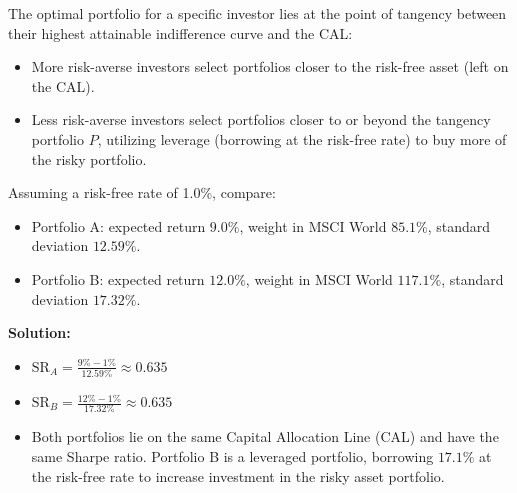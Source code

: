 The optimal portfolio for a specific investor lies at the point of tangency between their highest attainable indifference curve and the CAL:
\begin{itemize}
	\item More risk-averse investors select portfolios closer to the risk-free asset (left on the CAL).
	\item Less risk-averse investors select portfolios closer to or beyond the tangency portfolio $P$, utilizing leverage (borrowing at the risk-free rate) to buy more of the risky portfolio.
\end{itemize}
\begin{tcolorbox}[
	colback=gray!5!white,
	colframe=black!15!white,
	boxrule=0.5pt,
	arc=3pt,
	title=\textbf{Example 14: Calculating the Sharpe Ratio},
	coltitle=black,
	colbacktitle=black!5!white,
	before skip=6pt,
	after skip=6pt,
	breakable
]
Assuming a risk-free rate of 1.0\%, compare:
\begin{itemize}
	\item Portfolio A: expected return $9.0\%$, weight in MSCI World $85.1\%$, standard deviation $12.59\%$.
	\item Portfolio B: expected return $12.0\%$, weight in MSCI World $117.1\%$, standard deviation $17.32\%$.
\end{itemize}
\textbf{Solution:}
\begin{itemize}
	\item $\text{SR}_A = \frac{9\% - 1\%}{12.59\%} \approx 0.635$
	\item $\text{SR}_B = \frac{12\% - 1\%}{17.32\%} \approx 0.635$
	\item Both portfolios lie on the same Capital Allocation Line (CAL) and have the same Sharpe ratio. Portfolio B is a leveraged portfolio, borrowing $17.1\%$ at the risk-free rate to increase investment in the risky asset portfolio.
\end{itemize}
\end{tcolorbox}
